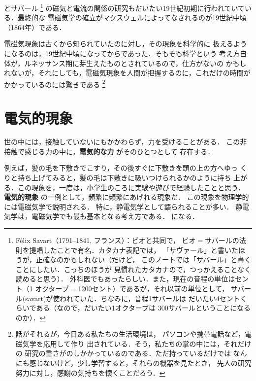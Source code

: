         とサバール
            \footnote{
                F\'{e}lix Savart（1791--1841, フランス）：ビオと共同で，
                ビオ$=$サバールの法則を提唱したことで有名．カタカナ表記では，
                「サヴァール」と書いたほうが，正確なのかもしれない（だけど，
                このノートでは「サバール」と書くことにしたい．こっちのほうが
                見慣れたカタカナので，つっかえることなく読めると思う）．
                外科医でもあったらしい．また，現在の音程の単位はセント（1
                オクターブ$=$1200セント）であるが，それ以前の単位として，
                サバール(savart)が使われていた．ちなみに，音程1サバールは
                だいたい4セントくらいである（なので，だいたい1オクターブは
                300サバールということになるのか）．
            }
        の磁気と電流の関係の研究もだいたい19世紀初期に行われていている．最終的な
        電磁気学の確立がマクスウェルによってなされるのが19世紀中頃（1864年）である．

        電磁気現象は古くから知られていたのに対し，その現象を科学的に
        扱えるようになるのは，19世紀中頃になってからであった．そもそも科学という
        考え方自体が，ルネッサンス期に芽生えたものとされているので，仕方がないの
        かもしれないが，それにしても，電磁気現象を人間が把握するのに，これだけの時間が
        かかっているのには驚きである
            \footnote{
                話がそれるが，今日ある私たちの生活環境は，
                パソコンや携帯電話など，電磁気学を応用して作り
                出されている．そう，私たちの掌の中には，それだけの
                研究の重さがのしかかっているのである．ただ持っているだけでは
                なんにも感じないけど，少し学習すると，それらの機器を見たとき，
                先人の研究努力に対し，感謝の気持ちを懐くことだろう．
            }

    \section{電気的現象}
        世の中には，接触していないにもかかわらず，力を受けることがある．
        この非接触で感じる力の中に，\textbf{電気的な力} がそのひとつとして
        存在する．

        例えば，髪の毛を下敷きでこすり，その後すぐに下敷きを頭の上の方へゆっ
        くりと持ち上げてみると，髪の毛は下敷きに吸いつけられるかのように持ち
        上がる．この現象を，一度は，小学生のころに実験や遊びで経験したことと思う．
        \textbf{電気的現象} の一例として，頻繁に頻繁にあげれる現象だ．
        この現象を物理学的には電磁気学で説明される．
        特に，静電気学として語られることが多い．
        静電気学は，電磁気学でも最も基本となる考え方である．
        になる．

